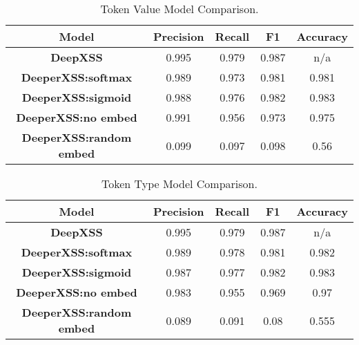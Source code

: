 \begin{table}
\begin{center}
\begingroup
\setlength{\tabcolsep}{2pt} %
\renewcommand{\arraystretch}{1.5} %
\begin{tabular}{|| c | c | c | c | c ||} 
    \hline
    Model & Precision & Recall & F1 & Accuracy \\ 
    \hline\hline
    \textbf{DeepXSS} &  0.995 & 0.979 & 0.987 & n/a \\ 
    \hline
    \textbf{DeeperXSS:softmax} & 0.989 & 0.973 & 0.981 & 0.981 \\
    \hline
    \textbf{DeeperXSS:sigmoid} & 0.988 & 0.976 & 0.982 & 0.983 \\
    \hline
    \textbf{DeeperXSS:no embed} & 0.991 & 0.956 & 0.973 & 0.975 \\
    \hline
    \textbf{DeeperXSS:random embed} & 0.099 & 0.097 & 0.098 & 0.56 \\
    \hline
\end{tabular}
\endgroup
\caption{\label{comparison}Token Value Model Comparison.}
\end{center}
\end{table}

\begin{table}
\begin{center}
\begingroup
\setlength{\tabcolsep}{2pt} %
\renewcommand{\arraystretch}{1.5} %
\begin{tabular}{|| c | c | c | c | c ||} 
    \hline
    Model & Precision & Recall & F1 & Accuracy \\ 
    \hline\hline
    \textbf{DeepXSS} &  0.995 & 0.979 & 0.987 & n/a \\ 
    \hline
    \textbf{DeeperXSS:softmax} & 0.989 & 0.978 & 0.981 & 0.982 \\
    \hline
    \textbf{DeeperXSS:sigmoid} & 0.987 & 0.977 & 0.982 & 0.983 \\
    \hline
    \textbf{DeeperXSS:no embed} & 0.983 & 0.955 & 0.969 & 0.97 \\
    \hline
    \textbf{DeeperXSS:random embed} & 0.089 & 0.091 & 0.08 & 0.555 \\
    \hline
\end{tabular}
\endgroup
\caption{\label{type:comparison}Token Type Model Comparison.}
\end{center}
\end{table}